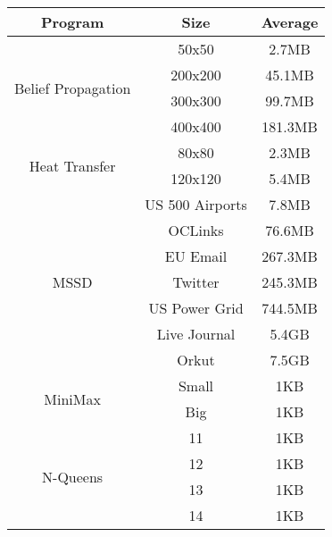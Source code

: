 \begin{tabular}{c | c | c } \hline
	\textbf{Program} & \textbf{Size} & \textbf{Average} \\ \hline \hline
	\multirow{4}{*}{Belief Propagation}  & 50x50 & 2.7MB\\
		 & 200x200 & 45.1MB\\
		 & 300x300 & 99.7MB\\
		 & 400x400 & 181.3MB\\
	\hline
	\multirow{2}{*}{Heat Transfer}  & 80x80 & 2.3MB\\
		 & 120x120 & 5.4MB\\
	\hline
	\multirow{7}{*}{MSSD}  & US 500 Airports & 7.8MB\\
		 & OCLinks & 76.6MB\\
		 & EU Email & 267.3MB\\
		 & Twitter & 245.3MB\\
		 & US Power Grid & 744.5MB\\
		 & Live Journal & 5.4GB\\
		 & Orkut & 7.5GB\\
	\hline
	\multirow{2}{*}{MiniMax}  & Small & 1KB\\
		 & Big & 1KB\\
	\hline
	\multirow{4}{*}{N-Queens}  & 11 & 1KB\\
		 & 12 & 1KB\\
		 & 13 & 1KB\\
		 & 14 & 1KB\\
	\hline
\end{tabular}
